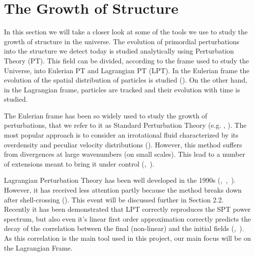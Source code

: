     
    

\section{The Growth of Structure}

In this section we will take a closer look at some of the tools we use to study the growth of structure in the universe. The evolution of primordial perturbations into the structure we detect today is studied analytically using Perturbation Theory (PT). This field can be divided, according to the frame used to study the Universe, into Eulerian PT and Lagrangian PT (LPT). In the Eulerian frame the evolution of the spatial distribution of particles is studied (\cite{Bernardeau_PT}). On the other hand, in the Lagrangian frame, particles are tracked and their evolution with time is studied.

The Eulerian frame has been so widely used to study the growth of perturbations, that we refer to it as Standard Perturbation Theory (e.g. \cite{1983MNRAS.203..345V}, \cite{peebles1980large}). The most popular approach is to consider an irrotational fluid characterized by its overdensity and peculiar velocity distributions (\cite{Carlson_perturbation_theory}). However, this method suffers from divergences at large wavenumbers (on small scales). This lead to a number of extensions meant to bring it under control (\cite{2006PhRvD..73f3519C},~\cite{2008PhRvD..77b3533C}). 

Lagrangian Perturbation Theory has been well developed in the 1990s (\cite{1992MNRAS.254..729B},~\cite{1993MNRAS.264..375B},~\cite{1994MNRAS.267..811B}). However, it has received less attention partly because the method breaks down after shell-crossing (\cite{Carlson_perturbation_theory}). This event will be discussed further in Section 2.2. Recently it has been demonstrated that LPT correctly reproduces the SPT power spectrum, but also even it's linear first order approximation correctly predicts the decay of the correlation between the final (non-linear) and the initial fields (\cite{2008PhRvD..77f3530M},~\cite{2008PhRvD..78h3519M}). As this correlation is the main tool used in this project, our main focus will be on the Lagrangian Frame. 


